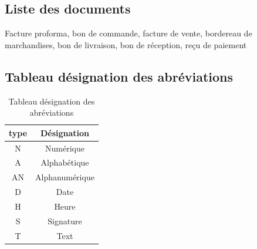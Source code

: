 \documentclass[edit,12pt,a4paper,ChapStyle,oneside,doubleinterligne]{report}
\begin{document}
\subsection{Liste des documents}
Facture proforma, bon de commande, facture de vente, bordereau de marchandises, bon de livraison, bon de réception, reçu de paiement
\subsection{Tableau désignation des abréviations}
\begin{table}[h!]
    \centering
    \begin{tabular}{|c|c|}
    \hline
        type & Désignation \\
        \hline
        N & Numérique \\
        A & Alphabétique \\
        AN & Alphanumérique \\
        D & Date\\
        H & Heure \\
        S & Signature \\
        T & Text \\
        \hline
    \end{tabular}
    \caption{Tableau désignation des abréviations}
    \label{tab:désignation des abréviations}
\end{table}
\newpage
\end{document}
